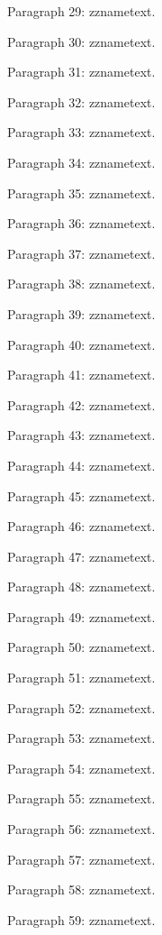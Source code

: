 \documentclass{article}
\begin{document}
Paragraph 29: \csname zzname\endcsname text.

Paragraph 30: \csname zzname\endcsname text.

Paragraph 31: \csname zzname\endcsname text.

Paragraph 32: \csname zzname\endcsname text.

Paragraph 33: \csname zzname\endcsname text.

Paragraph 34: \csname zzname\endcsname text.

Paragraph 35: \csname zzname\endcsname text.

Paragraph 36: \csname zzname\endcsname text.

Paragraph 37: \csname zzname\endcsname text.

Paragraph 38: \csname zzname\endcsname text.

Paragraph 39: \csname zzname\endcsname text.

Paragraph 40: \csname zzname\endcsname text.

Paragraph 41: \csname zzname\endcsname text.

Paragraph 42: \csname zzname\endcsname text.

Paragraph 43: \csname zzname\endcsname text.

Paragraph 44: \csname zzname\endcsname text.

Paragraph 45: \csname zzname\endcsname text.

Paragraph 46: \csname zzname\endcsname text.

Paragraph 47: \csname zzname\endcsname text.

Paragraph 48: \csname zzname\endcsname text.

Paragraph 49: \csname zzname\endcsname text.

Paragraph 50: \csname zzname\endcsname text.

Paragraph 51: \csname zzname\endcsname text.

Paragraph 52: \csname zzname\endcsname text.

Paragraph 53: \csname zzname\endcsname text.

Paragraph 54: \csname zzname\endcsname text.

Paragraph 55: \csname zzname\endcsname text.

Paragraph 56: \csname zzname\endcsname text.

Paragraph 57: \csname zzname\endcsname text.

Paragraph 58: \csname zzname\endcsname text.

Paragraph 59: \csname zzname\endcsname text.
\end{document}
